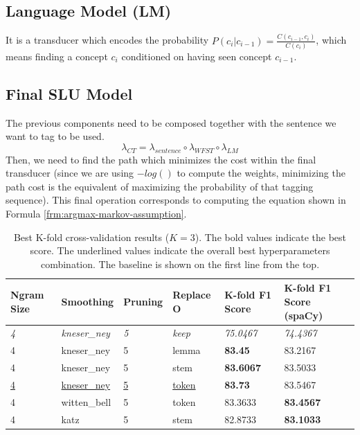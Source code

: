 \documentclass[11pt,a4paper]{article}
\begin{document}
\subsection{Language Model (LM)}
It is a transducer which encodes the probability $P(c_i|c_{i-1}) = \frac{C(c_{i-1}, c_i)}{C(c_i)}$, which means finding a concept $c_i$ conditioned on having seen concept $c_{i-1}$. 

\subsection{Final SLU Model}

The previous components need to be composed together with the sentence we want to tag to be used.
\begin{equation}
\lambda_{CT} = \lambda_{sentence} \circ \lambda_{WFST} \circ \lambda_{LM}
\end{equation}
Then, we need to find the path which minimizes the cost within the final transducer (since we are using $-log()$ to compute the weights, minimizing the path cost is the equivalent of maximizing the probability of that tagging sequence). This final operation corresponds to computing the equation shown in Formula \ref{frm:argmax-markov-assumption}.


\begin{table}[th!]
\centering
\caption{Best K-fold cross-validation results ($K=3$). The bold values indicate the best score. The underlined values indicate the overall best hyperparameters combination. The baseline is shown on the first line from the top.}
\label{tab:eval-resuts}
\begin{tabular}{llllll}
\textbf{Ngram Size} & \textbf{Smoothing} & \textbf{Pruning} & \textbf{Replace O} & \textbf{K-fold F1 Score} & \textbf{K-fold F1 Score (spaCy)} \\ \hline
\textit{4} & \textit{kneser\_ney} & \textit{5} & \textit{keep} & \textit{75.0467} & \textit{74.4367} \\ \hline
4 & kneser\_ney & 5 & lemma & \textbf{83.45} & 83.2167 \\
4 & kneser\_ney & 5 & stem & \textbf{83.6067} & 83.5033 \\
\underline{4} & \underline{kneser\_ney} & \underline{5} & \underline{token} & \textbf{83.73} & 83.5467 \\
4 & witten\_bell & 5 & token & 83.3633 & \textbf{83.4567} \\
4 & katz & 5 & stem & 82.8733 & \textbf{83.1033}
\end{tabular}
\end{table}
\end{document}
